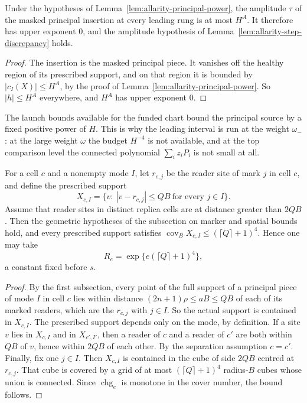 \begin{corollary}
\label{cor:allarity-rung-amplitude}
Under the hypotheses of Lemma~\ref{lem:allarity-principal-power}, the
amplitude $\tau$ of the masked principal insertion at every leading rung
is at most $H^A$. It therefore has upper exponent $0$, and the amplitude
hypothesis of Lemma~\ref{lem:allarity-step-discrepancy} holds.
\end{corollary}
\begin{proof}
The insertion is the masked principal piece. It vanishes off the healthy
region of its prescribed support, and on that region it is bounded by
$|c_I(X)|\le H^A$, by the proof of
Lemma~\ref{lem:allarity-principal-power}. So $|h|\le H^A$ everywhere, and
$H^A$ has upper exponent $0$.
\end{proof}

The launch bounds available for the funded chart bound the principal
source by a fixed positive power of $H$. This is why the leading interval
is run at the weight $\omega_-$: at the large weight $\omega$ the budget
$H^{-4}$ is not available, and at the top comparison level the
connected polynomial $\sum_iz_iP_i$ is not small at all.

\begin{lemma}
\label{lem:allarity-step-charge}
For a cell $c$ and a nonempty mode $I$, let $r_{c,j}$ be the reader site
of mark $j$ in cell $c$, and define the prescribed support
\[
 X_{c,I}=\{v:\ |v-r_{c,j}|\le QB\ \text{for every } j\in I\}.
\]
Assume that reader sites in distinct replica cells are at distance
greater than $2QB$. Then the geometric hypotheses of the subsection on
marker and spatial bounds hold, and every prescribed support satisfies
$\operatorname{cov}_BX_{c,I}\le(\lceil Q\rceil+1)^4$. Hence one may take
\[
 R_e=\exp\{e(\lceil Q\rceil+1)^4\},
\]
a constant fixed before $s$.
\end{lemma}
\begin{proof}
By the first subsection, every point of the full support of a principal
piece of mode $I$ in cell $c$ lies within distance
$(2n+1)\rho\le aB\le QB$ of each of its marked readers, which are the
$r_{c,j}$ with $j\in I$. So the actual support is contained in $X_{c,I}$.
The prescribed support depends only on the mode, by definition. If a site
$v$ lies in $X_{c,I}$ and in $X_{c',I'}$, then a reader of $c$ and a
reader of $c'$ are both within $QB$ of $v$, hence within $2QB$ of each
other. By the separation assumption $c=c'$. Finally, fix one $j\in I$.
Then $X_{c,I}$ is contained in the cube of side $2QB$ centred at
$r_{c,j}$. That cube is covered by a grid of at most
$(\lceil Q\rceil+1)^4$ radius-$B$ cubes whose union is connected. Since
$\operatorname{chg}_e$ is monotone in the cover number, the bound
follows.
\end{proof}

